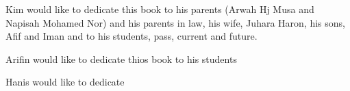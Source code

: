 
\thispagestyle{empty}

\begin{center}
Kim would like to dedicate this book to his parents (Arwah Hj Musa and Napisah Mohamed Nor) and his parents in law, his wife, Juhara Haron, his sons, Afif and Iman and to his students, pass, current and future.

Arifin would like to dedicate thios book to his students

Hanis would like to dedicate


\end{center}

\setlength{\abovedisplayskip}{-5pt}
\setlength{\abovedisplayshortskip}{-5pt}
